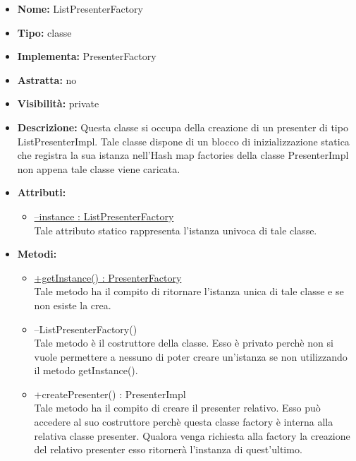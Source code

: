 			
			\begin{itemize}
			\item \textbf{Nome:} ListPresenterFactory
			\item \textbf{Tipo:} classe
			
		\item \textbf{Implementa:}
		PresenterFactory
		\item \textbf{Astratta:}
		no
			\item \textbf{Visibilità:} private
			\item \textbf{Descrizione:} Questa classe si occupa della creazione di un presenter di tipo ListPresenterImpl.  Tale classe dispone di un blocco di inizializzazione statica che registra la sua istanza nell'Hash map factories della classe PresenterImpl non appena tale classe viene caricata.
			\item \textbf{Attributi:}
				\begin{itemize}
				\setlength{\itemsep}{5pt}
				
					\item[\ding{111}] \underline{--instance : ListPresenterFactory} \\ [1mm] Tale attributo statico rappresenta l'istanza univoca di tale classe.
				\end{itemize}
		
			\item \textbf{Metodi:}
				\begin{itemize}
				\setlength{\itemsep}{5pt}
				
					\item[\ding{111}] {\underline{+getInstance() : PresenterFactory}} \\ [1mm] Tale metodo ha il compito di ritornare l'istanza unica di tale classe e se non esiste la crea.
					\item[\ding{111}] {{--ListPresenterFactory()}} \\ [1mm] Tale metodo è il costruttore della classe. Esso è privato perchè non si vuole permettere a nessuno di poter creare un'istanza se non utilizzando il metodo getInstance().
					\item[\ding{111}] {{+createPresenter() : PresenterImpl}} \\ [1mm] Tale metodo ha il compito di creare il presenter relativo. Esso può accedere al suo costruttore perchè questa classe factory è interna alla relativa classe presenter. Qualora venga richiesta alla factory la creazione del relativo presenter esso ritornerà l'instanza di quest'ultimo.
				\end{itemize}
		
			\end{itemize}

